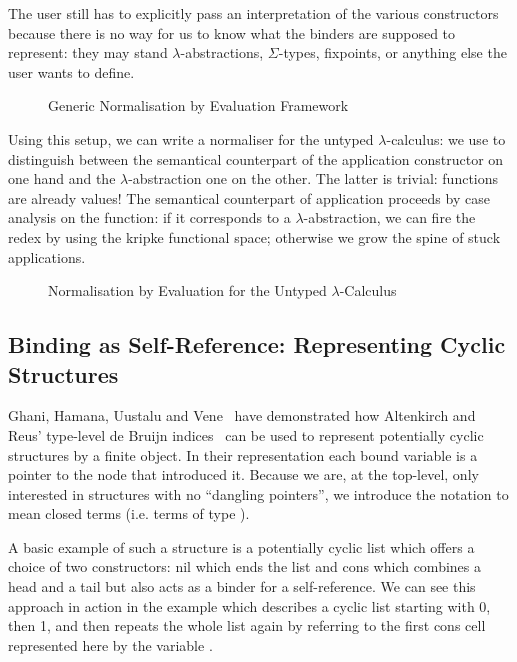 The user still has to explicitly pass an interpretation of
the various constructors because there is no way for us to
know what the binders are supposed to represent: they may
stand $\lambda$-abstractions, $\Sigma$-types, fixpoints, or
anything else the user wants to define.


\begin{figure}[h]
\caption{Generic Normalisation by Evaluation Framework}
\end{figure}

Using this setup, we can write a normaliser for the untyped
$\lambda$-calculus: we use  to distinguish between
the semantical counterpart of the application constructor on
one hand and the $\lambda$-abstraction one on the other.
The latter is trivial: functions are already
values! The semantical counterpart of application proceeds by
case analysis on the function: if it corresponds to a
$\lambda$-abstraction, we can fire the redex by using the kripke
functional space; otherwise we grow the spine of stuck
applications.


\begin{figure}[h]
\caption{Normalisation by Evaluation for the Untyped $\lambda$-Calculus}
\end{figure}



\subsection{Binding as Self-Reference: Representing Cyclic Structures}

Ghani, Hamana, Uustalu and Vene~\cite{ghani2006representing} have
demonstrated how Altenkirch and Reus' type-level de Bruijn
indices~\cite{altenkirch1999monadic} can be used to represent
potentially cyclic structures by a finite object. In their
representation each bound variable is a pointer to the node
that introduced it. Because we are, at the top-level, only
interested in structures with no ``dangling pointers'', we introduce
the notation   to mean closed terms (i.e. terms of type
   ).

A basic example of such a structure is a potentially cyclic list which
offers a choice of two constructors: nil which ends the list and cons
which combines a head and a tail but also acts as a binder for a
self-reference. We can see this approach in action in the example 
which describes a cyclic list starting with 0, then 1, and then
repeats the whole list again by referring to the first cons cell
represented here by the variable  .


